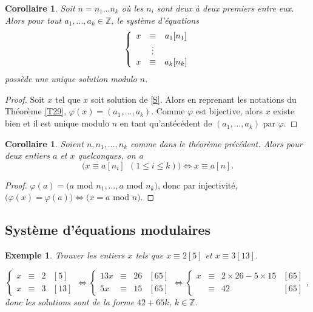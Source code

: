 \documentclass[10pt,a4paper]{report}
\newtheorem*{ex}{Exemple}
\newtheorem{Cor}[thm]{Corollaire}
\begin{document}
\begin{Cor}
Soit $n=n_1 \ldots n_k$ où les $n_i$ sont deux à deux premiers entre eux. Alors pour tout $a_1, \ldots, a_k \in \mathbb{Z}$, le système d'équations 
\begin{equation}{\color{red}\label{S}}
\left \{ \begin{array}{ccc}
x & \equiv & a_1 [n_1] \\
  &      \vdots    &   \\
x & \equiv & a_k [n_k]   
\end{array}   \right.
\end{equation}
possède une unique solution modulo $n$.
\end{Cor}

\begin{proof}
Soit $x$ tel que $x$ soit solution de \eqref{S}. Alors en reprenant les notations du Théorème \ref{T29}, $\varphi(x)=(a_1, \ldots, a_k)$. Comme $\varphi$ est bijective, alors $x$ existe bien et il est unique modulo $n$ en tant qu'antécédent de $(a_1, \ldots, a_k)$ par $\varphi$. 
\end{proof}

\begin{Cor}
Soient $n, n_1, \ldots, n_k$ comme dans le théorème précédent. Alors pour deux entiers $a$ et $x$ quelconques, on a 
$$ \big( x \equiv a [n_i] \ \ (1 \leqslant  i \leqslant k)    \big) \Longleftrightarrow x \equiv a [n]  .     $$
\end{Cor}

\begin{proof}
$\varphi(a)=(a$ mod $n_1, \ldots, a$ mod $n_k)$, donc par injectivité, $\big( \varphi(x)=\varphi(a) \big)  \Leftrightarrow  \big(  x= a $ mod $n \big)$.
\end{proof}


\subsection*{Système d'équations modulaires}

\begin{ex}
Trouver les entiers $x$ tels que $x\equiv 2 [5]$ et $x \equiv 3 [13]  $.\par 
\begin{equation*}
\left \{  \begin{array}{rcll}
x & \equiv & 2&  [5]\\
x & \equiv & 3&  [13]
\end{array}  \right. 
\Longleftrightarrow   
\left \{  \begin{array}{rcll}
13x & \equiv & 26&  [65]\\
5x & \equiv & 15&  [65]
\end{array}  \right. 
\Longleftrightarrow  
\left \{  \begin{array}{rcll}
x & \equiv & 2 \times 26  - 5 \times 15&  [65]\\
  & \equiv & 42&  [65]
\end{array}  \right. , 
\end{equation*}
donc les solutions sont de la forme $42+65 k$, $k \in \mathbb{Z}$.
\end{ex}
\end{document}
